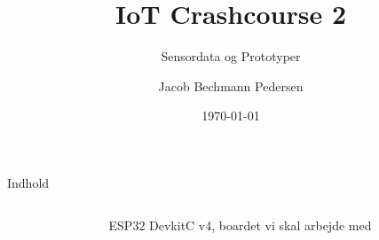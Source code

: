 \documentclass[aspectratio=169]{beamer}
\title{IoT Crashcourse 2}
\subtitle{Sensordata og Prototyper}
\author{Jacob Bechmann Pedersen}
\institute{Bechmann Engineering ApS}
\date{\today}
\begin{document}
\begin{frame}
	\titlepage
\end{frame}

\begin{frame}{Indhold}
	\begin{columns}
	\begin{column}{0.6\textwidth}
		\begin{fitBox}
			\tableofcontents{}
		\end{fitBox}
	\end{column}
	\begin{column}{0.4\textwidth}
		\centering
		\begin{figure}
  			
  			\caption{ESP32 DevkitC v4, boardet vi skal arbejde med}
  			\label{fig:esp32}
		\end{figure}
	\end{column}
	\end{columns}	
\end{frame}
\end{document}
